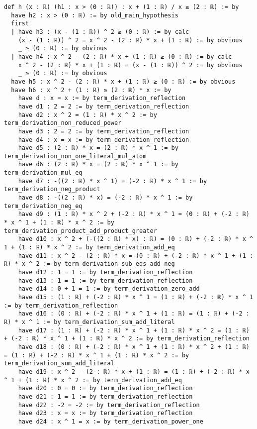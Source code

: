 \documentclass{article}
\begin{document}
\begin{tcolorbox}[colback=white!10, width=\linewidth]
\begin{lstlisting}[language=Lean4]
def h (x : ℝ) (h1 : x > (0 : ℝ)) : x + (1 : ℝ) / x ≥ (2 : ℝ) := by
  have h2 : x > (0 : ℝ) := by old_main_hypothesis
  first
  | have h3 : (x - (1 : ℝ)) ^ 2 ≥ (0 : ℝ) := by calc
    (x - (1 : ℝ)) ^ 2 = x ^ 2 - (2 : ℝ) * x + (1 : ℝ) := by obvious
    _ ≥ (0 : ℝ) := by obvious
  | have h4 : x ^ 2 - (2 : ℝ) * x + (1 : ℝ) ≥ (0 : ℝ) := by calc
    x ^ 2 - (2 : ℝ) * x + (1 : ℝ) = (x - (1 : ℝ)) ^ 2 := by obvious
    _ ≥ (0 : ℝ) := by obvious
  have h5 : x ^ 2 - (2 : ℝ) * x + (1 : ℝ) ≥ (0 : ℝ) := by obvious
  have h6 : x ^ 2 + (1 : ℝ) ≥ (2 : ℝ) * x := by
    have d : x = x := by term_derivation_reflection
    have d1 : 2 = 2 := by term_derivation_reflection
    have d2 : x ^ 2 = (1 : ℝ) * x ^ 2 := by term_derivation_non_reduced_power
    have d3 : 2 = 2 := by term_derivation_reflection
    have d4 : x = x := by term_derivation_reflection
    have d5 : (2 : ℝ) * x = (2 : ℝ) * x ^ 1 := by term_derivation_non_one_literal_mul_atom
    have d6 : (2 : ℝ) * x = (2 : ℝ) * x ^ 1 := by term_derivation_mul_eq
    have d7 : -((2 : ℝ) * x ^ 1) = (-2 : ℝ) * x ^ 1 := by term_derivation_neg_product
    have d8 : -((2 : ℝ) * x) = (-2 : ℝ) * x ^ 1 := by term_derivation_neg_eq
    have d9 : (1 : ℝ) * x ^ 2 + (-2 : ℝ) * x ^ 1 = (0 : ℝ) + (-2 : ℝ) * x ^ 1 + (1 : ℝ) * x ^ 2 := by term_derivation_product_add_product_greater
    have d10 : x ^ 2 + (-((2 : ℝ) * x) : ℝ) = (0 : ℝ) + (-2 : ℝ) * x ^ 1 + (1 : ℝ) * x ^ 2 := by term_derivation_add_eq
    have d11 : x ^ 2 - (2 : ℝ) * x = (0 : ℝ) + (-2 : ℝ) * x ^ 1 + (1 : ℝ) * x ^ 2 := by term_derivation_sub_eqs_add_neg
    have d12 : 1 = 1 := by term_derivation_reflection
    have d13 : 1 = 1 := by term_derivation_reflection
    have d14 : 0 + 1 = 1 := by term_derivation_zero_add
    have d15 : (1 : ℝ) + (-2 : ℝ) * x ^ 1 = (1 : ℝ) + (-2 : ℝ) * x ^ 1 := by term_derivation_reflection
    have d16 : (0 : ℝ) + (-2 : ℝ) * x ^ 1 + (1 : ℝ) = (1 : ℝ) + (-2 : ℝ) * x ^ 1 := by term_derivation_sum_add_literal
    have d17 : (1 : ℝ) + (-2 : ℝ) * x ^ 1 + (1 : ℝ) * x ^ 2 = (1 : ℝ) + (-2 : ℝ) * x ^ 1 + (1 : ℝ) * x ^ 2 := by term_derivation_reflection
    have d18 : (0 : ℝ) + (-2 : ℝ) * x ^ 1 + (1 : ℝ) * x ^ 2 + (1 : ℝ) = (1 : ℝ) + (-2 : ℝ) * x ^ 1 + (1 : ℝ) * x ^ 2 := by term_derivation_sum_add_literal
    have d19 : x ^ 2 - (2 : ℝ) * x + (1 : ℝ) = (1 : ℝ) + (-2 : ℝ) * x ^ 1 + (1 : ℝ) * x ^ 2 := by term_derivation_add_eq
    have d20 : 0 = 0 := by term_derivation_reflection
    have d21 : 1 = 1 := by term_derivation_reflection
    have d22 : -2 = -2 := by term_derivation_reflection
    have d23 : x = x := by term_derivation_reflection
    have d24 : x ^ 1 = x := by term_derivation_power_one

\end{lstlisting}
\end{tcolorbox}
\end{document}

